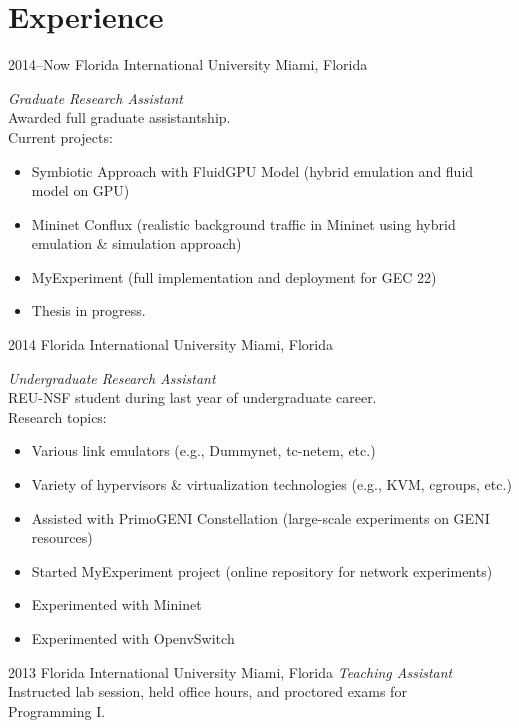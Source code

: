 \documentclass[print]{friggeri-cv} %
\begin{document}

\section{Experience}

\begin{entrylist}
\entry
{2014--Now}
{Florida International University}
{Miami, Florida}
{\emph{Graduate Research Assistant} \\
Awarded full graduate assistantship. \\
Current projects:
\begin{itemize}
    \item Symbiotic Approach with FluidGPU Model (hybrid emulation and fluid model on GPU)
    \item Mininet Conflux (realistic background traffic in Mininet using hybrid 
        \\emulation \& simulation approach)
    \item MyExperiment (full implementation and deployment for GEC 22)
    \item Thesis in progress.
\end{itemize}}
\entry
{2014}
{Florida International University}
{Miami, Florida}
{\emph{Undergraduate Research Assistant} \\
REU-NSF student during last year of undergraduate career.\\
Research topics:
\begin{itemize}
    \item Various link emulators (e.g., Dummynet, tc-netem, etc.)
    \item Variety of hypervisors \& virtualization technologies (e.g., KVM, cgroups, etc.)
    \item Assisted with PrimoGENI Constellation (large-scale experiments on GENI resources)
    \item Started MyExperiment project (online repository for network experiments)
    \item Experimented with Mininet
    \item Experimented with OpenvSwitch
\end{itemize}}
\entry
{2013}
{Florida International University}
{Miami, Florida}
{\emph{Teaching Assistant} \\
Instructed lab session, held office hours, and proctored exams for \\Programming I.}
\end{entrylist}
\end{document}
